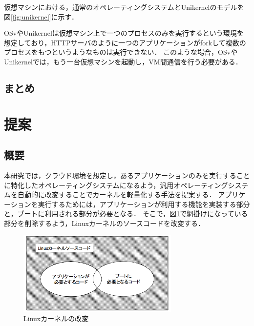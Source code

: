 \documentclass[graduation-thesis]{mlarticle}
\begin{document}
仮想マシンにおける，通常のオペレーティングシステムとUnikernelのモデルを図\ref{fig:unikernel}に示す．


OSvやUnikernelは仮想マシン上で一つのプロセスのみを実行するという環境を想定しており，HTTPサーバのように一つのアプリケーションがforkして複数のプロセスをもつというようなものは実行できない．
このような場合，OSvやUnikernelでは，もう一台仮想マシンを起動し，VM間通信を行う必要がある．

\subsection{まとめ}

\clearpage
\section{提案}
\label{proposal}

\subsection{概要}
\label{proposal:abstruction}
本研究では，クラウド環境を想定し，あるアプリケーションのみを実行することに特化したオペレーティングシステムになるよう，汎用オペレーティングシステムを自動的に改変することでカーネルを軽量化する手法を提案する．
アプリケーションを実行するためには，アプリケーションが利用する機能を実装する部分と，ブートに利用される部分が必要となる．
そこで，図\ref{fig:kernelcode}で網掛けになっている部分を削除するよう，Linuxカーネルのソースコードを改変する．

\begin{figure}[H]
  \begin{center}
    \includegraphics[width=8.0cm]{images/kernelcode.png}
    \caption{Linuxカーネルの改変}
    \label{fig:kernelcode}
  \end{center}
\end{figure}
\end{document}
